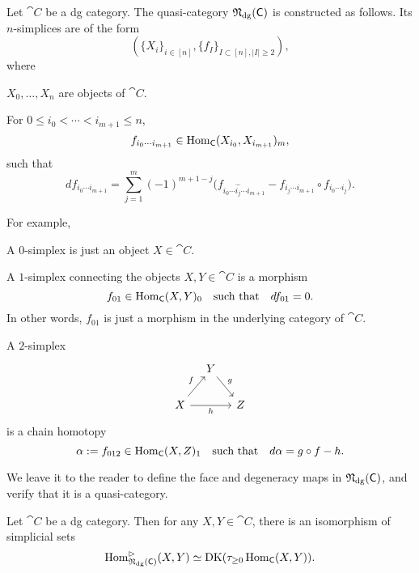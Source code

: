 \begin{construction}
    Let $\cat{C}$ be a dg category.
    The quasi-category $\mathfrak{N}_{\mathrm{dg}}(\mathsf{C})$ is constructed as follows.
    Its $n$-simplices are of the form 
    \[(\{X_i\}_{i\in[n]},\{f_I\}_{I\subset[n],|I|\geq2}),\]
    where 
    \begin{itms}
        \item $X_0,\dotsc,X_n$ are objects of $\cat{C}$.
        \item For $0\leq i_0<\cdots<i_{m+1}\leq n$,
        \[f_{i_0\cdots i_{m+1}}\in\operatorname{Hom}_{\mathsf{C}}(X_{i_0},X_{i_{m+1}})_m,\]
        such that 
        \[df_{i_0\cdots i_{m+1}}=\sum_{j=1}^m(-1)^{m+1-j}
        \bigl(f_{i_0\cdots\widehat{i_j}\cdots i_{m+1}}-f_{i_j\cdots i_{m+1}}\circ f_{i_0\cdots i_j}\bigr).\]
    \end{itms}
    For example,
    \begin{itms}
        \item A $0$-simplex is just an object $X\in\cat{C}$.
        \item A $1$-simplex connecting the objects $X,Y\in\cat{C}$ is a morphism
        \[f_{01}\in\operatorname{Hom}_{\mathsf{C}}(X,Y)_0\quad\text{such that}\quad df_{01}=0.\]
        In other words, $f_{01}$ is just a morphism in the underlying category of $\cat{C}$.
        \item A $2$-simplex
        \[\begin{tikzcd}[column sep=1em]
            & Y\ar[dr,"g"] \\
            X\ar[ur,"f"]\ar[rr,"h"'] && Z
        \end{tikzcd}\]
        is a chain homotopy
        \[\alpha:=f_{012}\in\operatorname{Hom}_{\mathsf{C}}(X,Z)_1\quad\text{such that}\quad d\alpha=g\circ f-h.\]
    \end{itms}
    We leave it to the reader to define the face and degeneracy maps in $\mathfrak{N}_{\mathrm{dg}}(\mathsf{C})$,
    and verify that it is a quasi-category. \varqed
\end{construction}

\begin{proposition}
    Let $\cat{C}$ be a dg category. Then for any $X,Y\in\cat{C}$,
    there is an isomorphism of simplicial sets
    \[\operatorname{Hom}_{\mathfrak{N}_{\mathrm{dg}}(\mathsf{C})}^{\vartriangleright}(X,Y)\simeq\operatorname{DK}(\tau_{\geq0}\operatorname{Hom}_{\mathsf{C}}(X,Y)).\]
\end{proposition}

